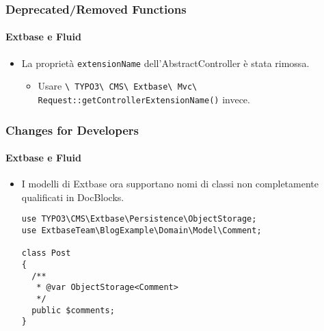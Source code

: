\begin{frame}[fragile]
	\frametitle{Deprecated/Removed Functions}
	\framesubtitle{Extbase e Fluid}

	\begin{itemize}
		\item La proprietà \texttt{extensionName} dell'AbstractController è stata rimossa.

			\begin{itemize}\smaller
				\item[\ding{228}] Usare \texttt{\textbackslash
					TYPO3\textbackslash
					CMS\textbackslash
					Extbase\textbackslash
					Mvc\textbackslash
					Request::getControllerExtensionName()} invece.
			\end{itemize}\normalsize

	\end{itemize}

\end{frame}


\begin{frame}[fragile]
	\frametitle{Changes for Developers}
	\framesubtitle{Extbase e Fluid}

	\lstset{basicstyle=\tiny\ttfamily}

	\begin{itemize}
		\item I modelli di Extbase ora supportano nomi di classi non completamente qualificati in DocBlocks.

\begin{lstlisting}
use TYPO3\CMS\Extbase\Persistence\ObjectStorage;
use ExtbaseTeam\BlogExample\Domain\Model\Comment;

class Post
{
  /**
   * @var ObjectStorage<Comment>
   */
  public $comments;
}
\end{lstlisting}

	\end{itemize}

\end{frame}


